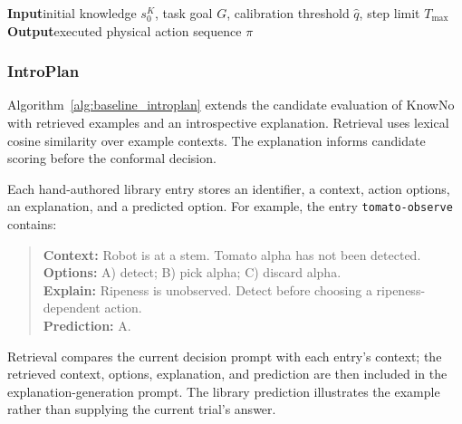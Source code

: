 \begin{algorithm}[H]
\caption{KnowNo}
\label{alg:baseline_knowno}
\textbf{Input}\quad initial knowledge $s_0^{K}$, task goal $G$, calibration threshold $\hat q$, step limit $T_{\max}$\\
\textbf{Output}\quad executed physical action sequence $\pi$
\BlankLine
{}
\end{algorithm}

\subsubsection{IntroPlan}
Algorithm~\ref{alg:baseline_introplan} extends the candidate evaluation of KnowNo with retrieved examples and an introspective explanation. Retrieval uses lexical cosine similarity over example contexts. The explanation informs candidate scoring before the conformal decision.

Each hand-authored library entry stores an identifier, a context, action options, an explanation, and a predicted option. For example, the entry \texttt{tomato-observe} contains:
\begin{quote}
\small
\textbf{Context:} Robot is at a stem. Tomato alpha has not been detected.\\
\textbf{Options:} A) detect; B) pick alpha; C) discard alpha.\\
\textbf{Explain:} Ripeness is unobserved. Detect before choosing a ripeness-dependent action.\\
\textbf{Prediction:} A.
\end{quote}
Retrieval compares the current decision prompt with each entry's context; the retrieved context, options, explanation, and prediction are then included in the explanation-generation prompt. The library prediction illustrates the example rather than supplying the current trial's answer.

